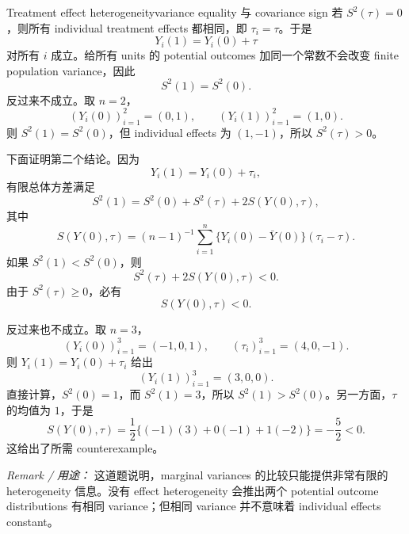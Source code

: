 \begin{exercisesolution}{Treatment effect heterogeneity}{variance equality 与 covariance sign}
若 $S^2(\tau)=0$，则所有 individual treatment effects 都相同，即 $\tau_i=\tau$。于是
\[
Y_i(1)=Y_i(0)+\tau
\]
对所有 $i$ 成立。给所有 units 的 potential outcomes 加同一个常数不会改变 finite population variance，因此
\[
S^2(1)=S^2(0).
\]
反过来不成立。取 $n=2$，
\[
(Y_i(0))_{i=1}^2=(0,1),\qquad
(Y_i(1))_{i=1}^2=(1,0).
\]
则 $S^2(1)=S^2(0)$，但 individual effects 为 $(1,-1)$，所以 $S^2(\tau)>0$。

下面证明第二个结论。因为
\[
Y_i(1)=Y_i(0)+\tau_i,
\]
有限总体方差满足
\[
S^2(1)=S^2(0)+S^2(\tau)+2S(Y(0),\tau),
\]
其中
\[
S(Y(0),\tau)=(n-1)^{-1}\sum_{i=1}^n\{Y_i(0)-\bar Y(0)\}(\tau_i-\tau).
\]
如果 $S^2(1)<S^2(0)$，则
\[
S^2(\tau)+2S(Y(0),\tau)<0.
\]
由于 $S^2(\tau)\geq0$，必有
\[
S(Y(0),\tau)<0.
\]

反过来也不成立。取 $n=3$，
\[
(Y_i(0))_{i=1}^3=(-1,0,1),\qquad
(\tau_i)_{i=1}^3=(4,0,-1).
\]
则 $Y_i(1)=Y_i(0)+\tau_i$ 给出
\[
(Y_i(1))_{i=1}^3=(3,0,0).
\]
直接计算，$S^2(0)=1$，而 $S^2(1)=3$，所以 $S^2(1)>S^2(0)$。另一方面，$\tau$ 的均值为 $1$，于是
\[
S(Y(0),\tau)=\frac{1}{2}\{(-1)(3)+0(-1)+1(-2)\}=-\frac{5}{2}<0.
\]
这给出了所需 counterexample。

\emph{Remark / 用途：} 这道题说明，marginal variances 的比较只能提供非常有限的 heterogeneity 信息。没有 effect heterogeneity 会推出两个 potential outcome distributions 有相同 variance；但相同 variance 并不意味着 individual effects constant。
\end{exercisesolution}

